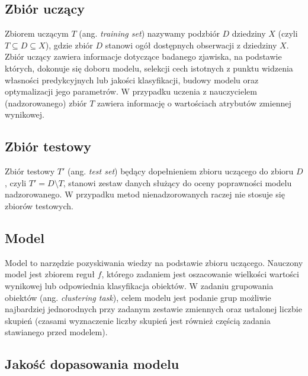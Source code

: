 \documentclass[
]{book}
\theoremstyle{plain}
\theoremstyle{definition}
\theoremstyle{definition}
\theoremstyle{definition}
\theoremstyle{definition}
\theoremstyle{remark}
\begin{document}
\hypertarget{zbiuxf3r-uczux105cy}{%
\subsection{Zbiór uczący}\label{zbiuxf3r-uczux105cy}}

Zbiorem uczącym \(T\) (ang. \emph{training set}) nazywamy podzbiór \(D\) dziedziny \(X\) (czyli \(T\subseteq D\subseteq X\)), gdzie zbiór \(D\) stanowi ogół dostępnych obserwacji z dziedziny \(X\). Zbiór uczący zawiera informacje dotyczące badanego zjawiska, na podstawie których, dokonuje się doboru modelu, selekcji cech istotnych z punktu widzenia własności predykcyjnych lub jakości klasyfikacji, budowy modelu oraz optymalizacji jego parametrów. W przypadku uczenia z nauczycielem (nadzorowanego) zbiór \(T\) zawiera informację o wartościach atrybutów zmiennej wynikowej.

\hypertarget{zbiuxf3r-testowy}{%
\subsection{Zbiór testowy}\label{zbiuxf3r-testowy}}

Zbiór testowy \(T'\) (ang. \emph{test set}) będący dopełnieniem zbioru uczącego do zbioru \(D\), czyli \(T'=D\setminus T\), stanowi zestaw danych służący do oceny poprawności modelu nadzorowanego. W przypadku metod nienadzorowanych raczej nie stosuje się zbiorów testowych.

\hypertarget{model}{%
\subsection{Model}\label{model}}

Model to narzędzie pozyskiwania wiedzy na podstawie zbioru uczącego. Nauczony model jest zbiorem reguł \(f\), którego zadaniem jest oszacowanie wielkości wartości wynikowej lub odpowiednia klasyfikacja obiektów. W zadaniu grupowania obiektów (ang. \emph{clustering task}), celem modelu jest podanie grup możliwie najbardziej jednorodnych przy zadanym zestawie zmiennych oraz ustalonej liczbie skupień (czasami wyznaczenie liczby skupień jest również częścią zadania stawianego przed modelem).

\hypertarget{jakoux15bux107-dopasowania-modelu}{%
\subsection{Jakość dopasowania modelu}\label{jakoux15bux107-dopasowania-modelu}}
\end{document}
